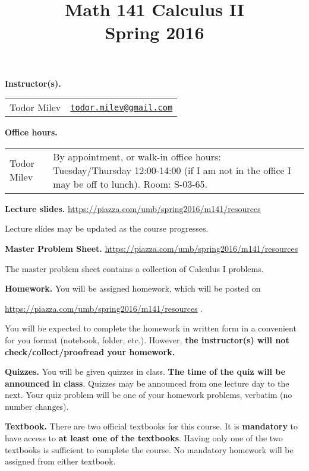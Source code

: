 \documentclass{article}
\title{Math 141 Calculus II \\ Spring 2016}
\date{}
\newcommand{\websitebase}{https://piazza.com/umb/spring2016/m141}
\begin{document}
\maketitle

\noindent \textbf{Instructor(s).} 
\begin{tabular}{ll}
Todor Milev & \href{mailto:todor.milev@gmail.com}{\nolinkurl{todor.milev@gmail.com}} 
\end{tabular}

\medskip
\noindent \textbf{Office hours. } \begin{tabular}{lp{12cm}}
Todor Milev & By appointment, or walk-in office hours: Tuesday/Thursday 12:00-14:00 (if I am not in the office I may be off to lunch).  Room: S-03-65.\\
\end{tabular}





\medskip \noindent \textbf{Lecture slides. }  \url{\websitebase/resources}

\medskip\noindent Lecture slides may be updated as the course progresses.


\medskip \noindent \textbf{Master Problem Sheet. }  \url{\websitebase/resources} 

\medskip\noindent The master problem sheet contains a collection of Calculus I problems. 

\medskip
\noindent \textbf{Homework.} You will be assigned homework, which will be posted on

\url{\websitebase/resources} \quad \quad \quad .

\noindent You will be expected to complete the homework in written form in a convenient for you format (notebook, folder, etc.). However, \textbf{the instructor(s) will not check/collect/proofread your homework.} 
 
\medskip
\noindent \textbf{Quizzes.} You will be given quizzes in class. \textbf{The time of the quiz will be announced in class}. Quizzes may be announced from one lecture day to the next. Your quiz problem will be one of your homework problems, verbatim (no number changes).





\medskip\noindent \textbf{Textbook. } There are two official textbooks for this course. It is  \textbf{mandatory} to have access to \textbf{at least one of the textbooks}. Having only one of the two textbooks is sufficient to complete the course. No mandatory homework will be assigned from either textbook. 
\end{document}
